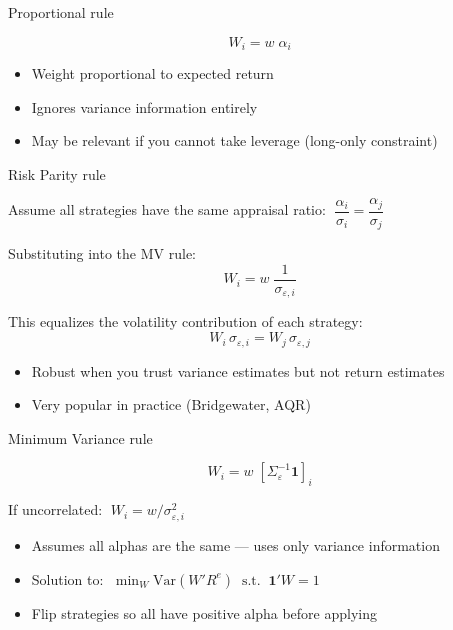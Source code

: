 \documentclass[aspectratio=169,10pt]{beamer}
\begin{document}

\begin{frame}{Proportional rule}

$$W_i = w \; \alpha_i$$

\vskip 10pt

\begin{itemize}
\item Weight proportional to expected return
\item Ignores variance information entirely
\item May be relevant if you cannot take leverage (long-only constraint)
\end{itemize}

\end{frame}


\begin{frame}{Risk Parity rule}

Assume all strategies have the same appraisal ratio: $\;\dfrac{\alpha_i}{\sigma_i} = \dfrac{\alpha_j}{\sigma_j}$

\vskip 8pt

Substituting into the MV rule:
$$W_i = w \; \frac{1}{\sigma_{\varepsilon,i}}$$

\vskip 8pt

This equalizes the volatility contribution of each strategy:
$$W_i \, \sigma_{\varepsilon,i} = W_j \, \sigma_{\varepsilon,j}$$

\vskip 10pt

\begin{itemize}
\item Robust when you trust variance estimates but not return estimates
\item Very popular in practice (Bridgewater, AQR)
\end{itemize}

\end{frame}


\begin{frame}{Minimum Variance rule}

$$W_i = w \; [\Sigma_\varepsilon^{-1} \mathbf{1}]_i$$

\vskip 8pt

If uncorrelated: $\;W_i = w / \sigma_{\varepsilon,i}^2$

\vskip 10pt

\begin{itemize}
\item Assumes all alphas are the same --- uses only variance information
\item Solution to: $\;\min_W \text{Var}(W' R^e) \;\;\text{s.t.}\;\; \mathbf{1}'W = 1$
\item Flip strategies so all have positive alpha before applying
\end{itemize}

\end{frame}
\end{document}
